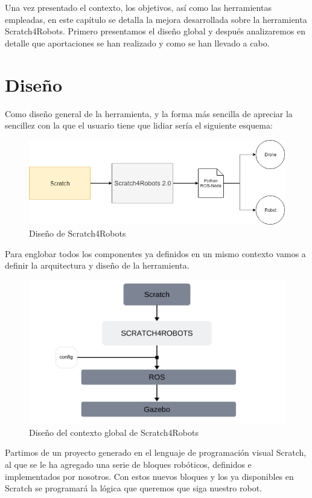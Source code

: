 Una vez presentado el contexto, los objetivos, así como las herramientas empleadas, en este capítulo se detalla la mejora desarrollada sobre la herramienta Scratch4Robots. Primero presentamos el diseño global y después analizaremos en detalle que aportaciones se han realizado y como se han llevado a cabo.
\section{Diseño}
\label{sec:diseno}
Como diseño general de la herramienta, y la forma más sencilla de apreciar la sencillez con la que el usuario tiene que lidiar sería el siguiente esquema:
\begin{figure}[H]
    \centering
    \includegraphics[scale=0.6]{img/s4r-diagram2.png}
  	\caption{Diseño de Scratch4Robots}
  	\label{fig:s4r}
\end{figure}

Para englobar todos los componentes ya definidos en un mismo contexto vamos a definir la arquitectura y diseño de la herramienta.
\begin{figure}[H]
    \centering
    \includegraphics[scale=0.30]{img/diseno.jpg}
  	\caption{Diseño del contexto global de Scratch4Robots}
  	\label{fig:s4r}
\end{figure}
Partimos de un proyecto generado en el lenguaje de programación visual Scratch, al que se le ha agregado una serie de bloques robóticos, definidos e implementados por nosotros. Con estos nuevos bloques y los ya disponibles en Scratch se programará la lógica que queremos que siga nuestro robot.\\

